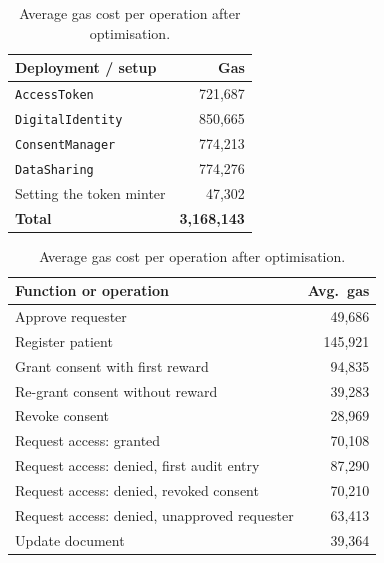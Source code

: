 \documentclass[10pt,a4paper]{article}
\begin{document}
\begin{table}[htbp]
  \centering
  \footnotesize
  \begin{minipage}[t]{0.40\linewidth}
    \centering
    \vspace{0pt}
    \begin{tabular}{lr}
      \toprule
      \textbf{Deployment / setup} & \textbf{Gas} \\
      \midrule
      \texttt{AccessToken} & 721,687 \\
      \texttt{DigitalIdentity} & 850,665 \\
      \texttt{ConsentManager} & 774,213 \\
      \texttt{DataSharing} & 774,276 \\
      Setting the token minter & 47,302 \\
      \midrule
      \textbf{Total} & \textbf{3,168,143} \\
      \bottomrule
    \end{tabular}
    \caption{Deployment and setup gas costs.}
    \label{tab:deploy}
  \end{minipage}\hfill
  \begin{minipage}[t]{0.57\linewidth}
    \centering
    \vspace{0pt}
    \begin{tabular}{lr}
      \toprule
      \textbf{Function or operation} & \textbf{Avg.\ gas} \\
      \midrule
      Approve requester & 49,686 \\
      Register patient & 145,921 \\
      Grant consent with first reward & 94,835 \\
      Re-grant consent without reward & 39,283 \\
      Revoke consent & 28,969 \\
      Request access: granted & 70,108 \\
      Request access: denied, first audit entry & 87,290 \\
      Request access: denied, revoked consent & 70,210 \\
      Request access: denied, unapproved requester & 63,413 \\
      Update document & 39,364 \\
      \bottomrule
    \end{tabular}
    \caption{Average gas cost per operation after optimisation.}
    \label{tab:gas}
  \end{minipage}
\end{table}
\end{document}
